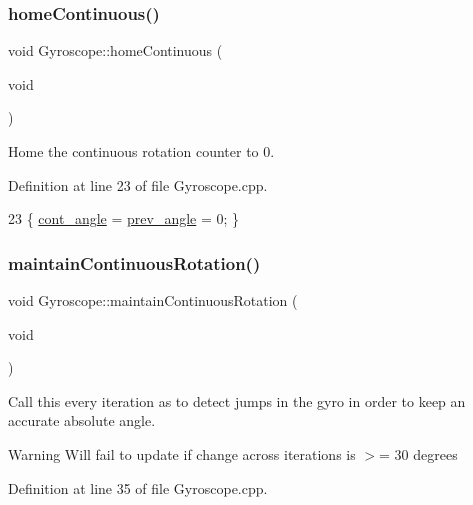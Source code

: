 \subsubsection{\texorpdfstring{home\+Continuous()}{homeContinuous()}}
{\footnotesize\ttfamily void Gyroscope\+::home\+Continuous (\begin{DoxyParamCaption}\item[{void}]{ }\end{DoxyParamCaption})}



Home the continuous rotation counter to 0. 



Definition at line 23 of file Gyroscope.\+cpp.


\begin{DoxyCode}
23 \{ \hyperlink{class_gyroscope_a1ed017e1e0767f70dfda902b858e04bc}{cont\_angle} = \hyperlink{class_gyroscope_a05294072cbb0e362975d3f0ad626b716}{prev\_angle} = 0; \}
\end{DoxyCode}
\mbox{\label{class_gyroscope_aa785de79696a6ce67e2b2b48b05e6020}} 
\subsubsection{\texorpdfstring{maintain\+Continuous\+Rotation()}{maintainContinuousRotation()}}
{\footnotesize\ttfamily void Gyroscope\+::maintain\+Continuous\+Rotation (\begin{DoxyParamCaption}\item[{void}]{ }\end{DoxyParamCaption})}



Call this every iteration as to detect jumps in the gyro in order to keep an accurate absolute angle. 

\begin{DoxyWarning}{Warning}
Will fail to update if change across iterations is $>$= 30 degrees 
\end{DoxyWarning}


Definition at line 35 of file Gyroscope.\+cpp.


